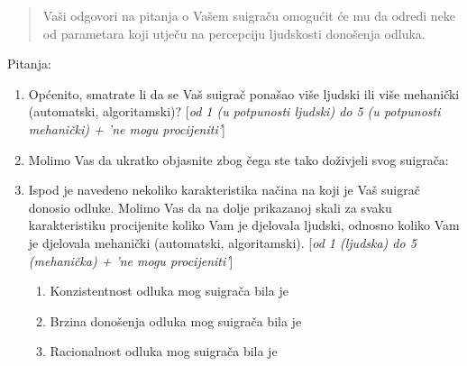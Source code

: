\documentclass[a4paper, 12pt]{report}
\begin{document}
\begin{appendices}
\begin{quote}
    Vaši odgovori na pitanja o Vašem suigraču omogućit će mu da odredi neke od
    parametara koji utječu na percepciju ljudskosti donošenja odluka.
\end{quote}

Pitanja: 
\begin{enumerate}[label = \arabic*)]
    \itemsep0em
    \item Općenito, smatrate li da se Vaš suigrač ponašao više ljudski ili više
        mehanički (automatski, algoritamski)? [\textit{od 1 (u potpunosti
            ljudski) do 5 (u potpunosti mehanički) + 'ne mogu procijeniti'}]
    \item Molimo Vas da ukratko objasnite zbog čega ste tako doživjeli svog
        suigrača:
    \item Ispod je navedeno nekoliko karakteristika načina na koji je Vaš
        suigrač donosio odluke. Molimo Vas da na dolje prikazanoj skali za svaku
        karakteristiku procijenite koliko Vam je djelovala ljudski, odnosno
        koliko Vam je djelovala mehanički (automatski, algoritamski).
        [\textit{od 1 (ljudska) do 5 (mehanička) + 'ne mogu procijeniti'}]
        \begin{enumerate}[label = \textbullet]
            \item Konzistentnost odluka mog suigrača bila je
            \item Brzina donošenja odluka mog suigrača bila je
            \item Racionalnost odluka mog suigrača bila je
            \end{enumerate}
\end{enumerate}

\end{appendices}

\clearpage



{
    
}
\end{document}

